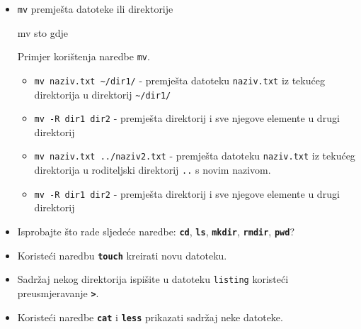 \begin{itemize}
\item \texttt{mv} premješta datoteke ili direktorije
\begin{prototip}
mv sto gdje
\end{prototip}

\begin{primjer} Primjer korištenja naredbe \texttt{mv}.
\begin{itemize}
 \item \lstinline!mv naziv.txt ~/dir1/! - premješta datoteku \texttt{naziv.txt} iz tekućeg direktorija u direktorij \lstinline!~/dir1/!
 \item \lstinline!mv -R dir1 dir2! - premješta direktorij i sve njegove elemente u drugi direktorij 
\item \lstinline!mv naziv.txt ../naziv2.txt! - premješta datoteku \texttt{naziv.txt} iz tekućeg direktorija u roditeljski direktorij \texttt{..} s novim nazivom.
 \item \lstinline!mv -R dir1 dir2! - premješta direktorij i sve njegove elemente u drugi direktorij 
\end{itemize}
\end{primjer}

\end{itemize}
\begin{zadatak}
\begin{itemize}
\item Isprobajte što rade sljedeće naredbe: \textbf{\texttt{cd}}, \textbf{\texttt{ls}}, \textbf{\texttt{mkdir}}, \textbf{\texttt{rmdir}}, \textbf{\texttt{pwd}}?
\item Koristeći naredbu \textbf{\texttt{touch}} kreirati novu datoteku.
\item Sadržaj nekog direktorija ispišite u datoteku \texttt{listing} koristeći preusmjeravanje\textbf{ \texttt{>}}.
\item Koristeći naredbe \textbf{\texttt{cat}} i \textbf{\texttt{less}} prikazati sadržaj neke datoteke.
\end{itemize}

\end{zadatak}

